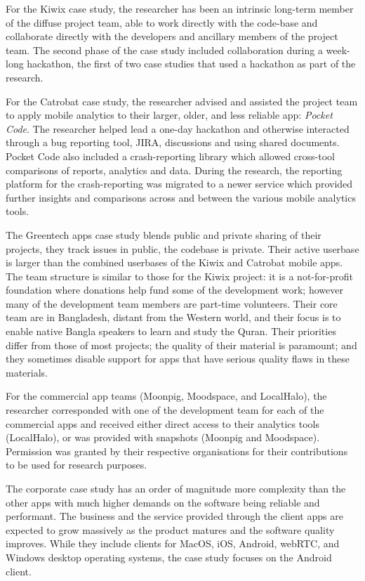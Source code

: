For the Kiwix case study, the researcher has been an intrinsic long-term member of the diffuse project team, able to work directly with the code-base and collaborate directly with the developers and ancillary members of the project team. The second phase of the case study included collaboration during a week-long hackathon, the first of two case studies that used a hackathon as part of the research. 

For the Catrobat case study, the researcher advised and assisted the project team to apply mobile analytics to their larger, older, and less reliable app: \emph{Pocket Code}. The researcher helped lead a one-day hackathon and otherwise interacted through a bug reporting tool, JIRA, discussions and using shared documents. Pocket Code also included a crash-reporting library which allowed cross-tool comparisons of reports, analytics and data. During the research, the reporting platform for the crash-reporting was migrated to a newer service which provided further insights and comparisons across and between the various mobile analytics tools.

The Greentech apps case study blends public and private sharing of their projects, they track issues in public, the codebase is private. Their active userbase is larger than the combined userbases of the Kiwix and Catrobat mobile apps. The team structure is similar to those for the Kiwix project: it is a not-for-profit foundation where donations help fund some of the development work; however many of the development team members are part-time volunteers. Their core team are in Bangladesh, distant from the Western world, and their focus is to enable native Bangla speakers to learn and study the Quran. Their priorities differ from those of most projects; the quality of their material is paramount; and they sometimes disable support for apps that have serious quality flaws in these materials. 

For the commercial app teams (Moonpig, Moodspace, and LocalHalo), the researcher corresponded with one of the development team for each of the commercial apps and received either direct access to their analytics tools (LocalHalo), or was provided with snapshots (Moonpig and Moodspace). Permission was granted by their respective organisations for their contributions to be used for research purposes.

The corporate case study has an order of magnitude more complexity than the other apps with much higher demands on the software being reliable and performant. The business and the service provided through the client apps are expected to grow massively as the product matures and the software quality improves. While they include clients for MacOS, iOS, Android, webRTC, and Windows desktop operating systems, the case study focuses on the Android client.


